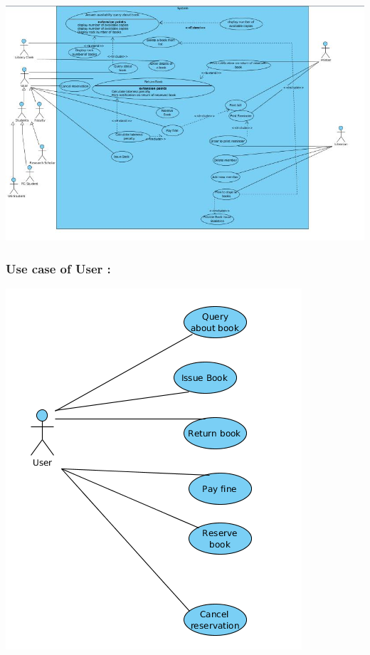 \documentclass[a4paper]{article}
\begin{document}
\includegraphics[scale=0.55]{images/useCaseDiag.jpg}\\

\subsubsection*{Use case of User :}
\includegraphics[scale=0.6]{images/userCaseDiag.png}\\
\end{document}
